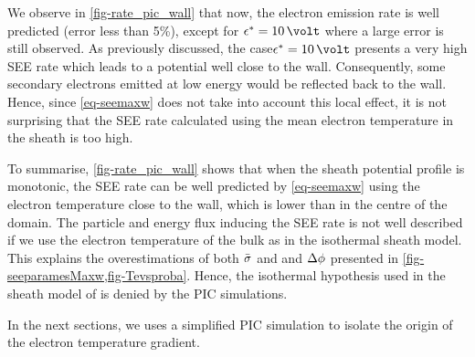  We observe in \cref{fig-rate_pic_wall} that now, the electron emission rate is well predicted (error less than 5\%), except for $\crover=10\,\volt$ where a large error is still observed.
 As previously discussed, the case$\crover=10\,\volt$ presents a very high SEE rate which leads to a potential well close to the wall.
 Consequently, some secondary electrons emitted at low energy would be reflected back to the wall.
 Hence, since \cref{eq-seemaxw} does not take into account this local effect, it is not surprising that the SEE rate calculated using the mean electron temperature in the sheath is too high.
 
To summarise, \cref{fig-rate_pic_wall} shows that when the sheath potential profile is monotonic, the
\ac{SEE} rate can be well predicted by \cref{eq-seemaxw} using the electron temperature close to the wall, which is lower than in the centre of the domain.
The particle and energy flux inducing the \ac{SEE} rate is not well described if we use
the electron temperature of the bulk as in the isothermal sheath model.
 This explains the overestimations of both $ \bar{\sigma }$ and and $\Delta \phi$ presented in \cref{fig-seeparamesMaxw,fig-Tevsproba}.
 Hence, the isothermal hypothesis used in the sheath model of  is denied by the PIC simulations.
 
 In the next sections, we uses a simplified \ac{PIC} simulation to isolate the origin of the electron temperature gradient.
 

